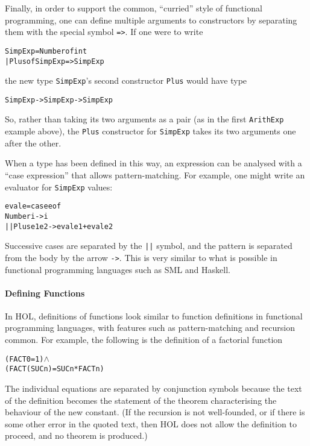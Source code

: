\documentclass[11pt]{article}
\begin{document}
\vspace{1ex}
\noindent Finally, in order to support the common, ``curried'' style of
functional programming, one can define multiple arguments to
constructors by separating them with the special symbol
\texttt{=>}. If one were to write
\begin{alltt}
   SimpExp = Number of int
           | Plus of SimpExp => SimpExp
\end{alltt}
the new type \texttt{SimpExp}'s second constructor \texttt{Plus} would
have type
\begin{alltt}
   SimpExp -> SimpExp -> SimpExp
\end{alltt}
So, rather than taking its two arguments as a pair (as in the first
\texttt{ArithExp} example above), the \texttt{Plus} constructor for
\texttt{SimpExp} takes its two arguments one after the other.

\vspace{1ex}  When a type has been
defined in this way, an expression can be analysed with a ``case
expression'' that allows pattern-matching.  For example, one might
write an evaluator for \texttt{SimpExp} values:
\begin{alltt}
   eval e  =  case e of
                 Number i -> i
              || Plus e1 e2 -> eval e1 + eval e2
\end{alltt}
Successive cases are separated by the \texttt{||} symbol, and the
pattern is separated from the body by the arrow \texttt{->}.  This is
very similar to what is possible in functional programming languages
such as SML and Haskell.


\paragraph{Defining Functions}
In HOL, definitions of functions look similar to function definitions
in functional programming languages, with features such as
pattern-matching and recursion common.  For example, the following is
the definition of a factorial function
\begin{alltt}
   (FACT 0 = 1) \(\land\)
   (FACT (SUC n) = SUC n * FACT n)
\end{alltt}
The individual equations are separated by conjunction symbols because
the text of the definition becomes the statement of the theorem
characterising the behaviour of the new constant.  (If the recursion
is not well-founded, or if there is some other error in the quoted
text, then HOL does not allow the definition to proceed, and no
theorem is produced.)
\end{document}
